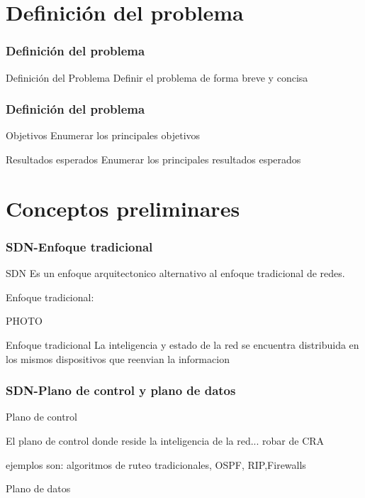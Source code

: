 \documentclass{beamer}
\begin{document}
\section{Definición del problema} 


\begin{frame}
\frametitle{Definición del problema} 

\begin{block}{Definición del Problema }
Definir el problema de forma breve y concisa
\end{block}
\end{frame}

\begin{frame}
\frametitle{Definición del problema} 

\begin{block}{Objetivos}
Enumerar los principales objetivos
\end{block}

\begin{block}{Resultados esperados}
Enumerar los principales resultados esperados
\end{block}

\end{frame}


\section{Conceptos preliminares} 


\begin{frame}
\frametitle{SDN-Enfoque tradicional} 


SDN Es un enfoque arquitectonico alternativo al enfoque tradicional de redes.

Enfoque tradicional:

PHOTO

\begin{block}{Enfoque tradicional}
La inteligencia y estado de la red se encuentra distribuida en los mismos dispositivos que reenvian la informacion
\end{block}


\end{frame}

\begin{frame}
\frametitle{SDN-Plano de control y plano de datos} 


\begin{block}{Plano de control}

El plano de control donde reside la inteligencia de la red... robar de CRA
\end{block}
ejemplos son: algoritmos de ruteo tradicionales, OSPF, RIP,Firewalls


\begin{block}{Plano de datos}
\end{block}




\end{frame}
\end{document}
